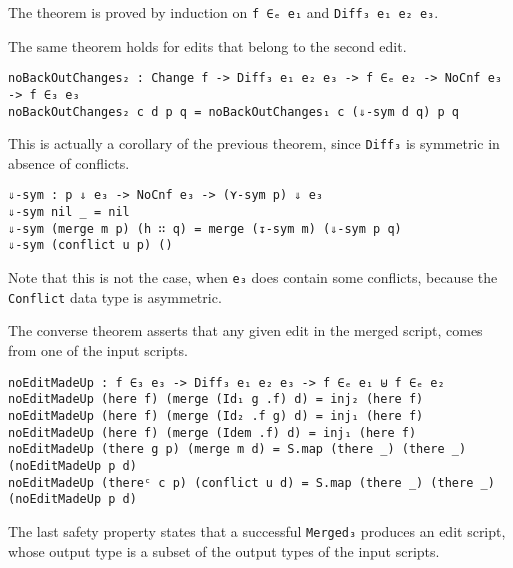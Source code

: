 \documentclass[../Thesis.tex]{subfiles}
\begin{document}
	The theorem is proved by induction on \texttt{f ∈ₑ e₁} and 
	\texttt{Diff₃ e₁ e₂ e₃}.

	The same theorem holds for edits that belong to the second edit.
	
\begin{verbatim}
noBackOutChanges₂ : Change f -> Diff₃ e₁ e₂ e₃ -> f ∈ₑ e₂ -> NoCnf e₃ -> f ∈₃ e₃
noBackOutChanges₂ c d p q = noBackOutChanges₁ c (⇓-sym d q) p q
\end{verbatim}
	
	This is actually a corollary of the previous theorem, since
	\texttt{Diff₃} is symmetric in absence of conflicts.
	
\begin{verbatim}
⇓-sym : p ⇓ e₃ -> NoCnf e₃ -> (⋎-sym p) ⇓ e₃
⇓-sym nil _ = nil
⇓-sym (merge m p) (h ∷ q) = merge (↧-sym m) (⇓-sym p q)
⇓-sym (conflict u p) ()
\end{verbatim}	
	Note that this is not the case, when \texttt{e₃} does contain some conflicts,
	because the \texttt{Conflict} data type is asymmetric.
		
	The converse theorem asserts that any given edit in the merged script,
	comes from one of the input scripts.
	
\begin{verbatim}
noEditMadeUp : f ∈₃ e₃ -> Diff₃ e₁ e₂ e₃ -> f ∈ₑ e₁ ⊎ f ∈ₑ e₂
noEditMadeUp (here f) (merge (Id₁ g .f) d) = inj₂ (here f)
noEditMadeUp (here f) (merge (Id₂ .f g) d) = inj₁ (here f)
noEditMadeUp (here f) (merge (Idem .f) d) = inj₁ (here f)
noEditMadeUp (there g p) (merge m d) = S.map (there _) (there _) (noEditMadeUp p d)
noEditMadeUp (thereᶜ c p) (conflict u d) = S.map (there _) (there _) (noEditMadeUp p d)
\end{verbatim}

	The last safety property states that a successful \texttt{Merged₃}
	produces an edit script, whose output type is a subset of the output
	types of the input scripts.
	
\end{document}
